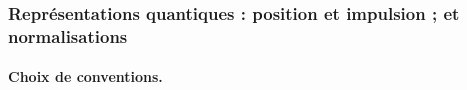 



\subsubsection{Représentations quantiques : position et impulsion ; et normalisations}

\paragraph{Choix de conventions.}

